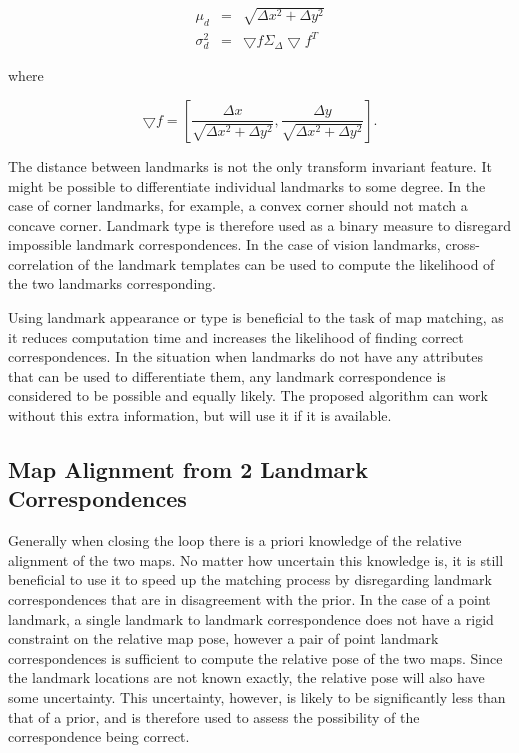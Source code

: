 \begin{eqnarray}
\mu_d &=& \sqrt{\Delta x^2 +\Delta y^2}\\
\sigma_d^2 &=& \bigtriangledown f \Sigma_\Delta \bigtriangledown f^T
\end{eqnarray}

where

$$ 
\bigtriangledown f = \left[
\frac{\Delta x}{\sqrt{\Delta x^2 + \Delta y^2}}, 
\frac{\Delta y}{\sqrt{\Delta x^2 + \Delta y^2}}
\right].
$$


The distance between landmarks is not the only transform invariant
feature. It might be possible to differentiate individual landmarks to
some degree. In the case of corner landmarks, for example, a convex
corner should not match a concave corner. Landmark type is therefore
used as a binary measure to disregard impossible landmark
correspondences. In the case of vision landmarks, cross-correlation of
the landmark templates can be used to compute the likelihood of the
two landmarks corresponding.

Using landmark appearance or type is beneficial to the task of map
matching, as it reduces computation time and increases the likelihood
of finding correct correspondences. In the situation when landmarks do
not have any attributes that can be used to differentiate them, any
landmark correspondence is considered to be possible and equally
likely. The proposed algorithm can work without this extra
information, but will use it if it is available.

\subsection{Map Alignment from 2 Landmark Correspondences}

Generally when closing the loop there is a priori knowledge of the
relative alignment of the two maps. No matter how uncertain this
knowledge is, it is still beneficial to use it to speed up the
matching process by disregarding landmark correspondences that are in
disagreement with the prior. In the case of a point landmark, a single
landmark to landmark correspondence does not have a rigid constraint
on the relative map pose, however a pair of point landmark
correspondences is sufficient to compute the relative pose of the two
maps. Since the landmark locations are not known exactly, the relative
pose will also have some uncertainty. This uncertainty, however, is
likely to be significantly less than that of a prior, and is therefore
used to assess the possibility of the correspondence being
correct.

